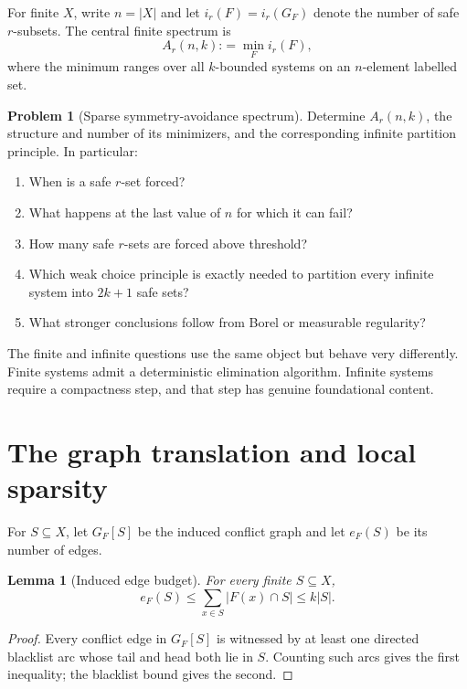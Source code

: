 \documentclass[11pt]{article}
\newtheorem{lemma}[theorem]{Lemma}
\theoremstyle{definition}
\newtheorem{problem}[theorem]{Problem}
\theoremstyle{remark}
\newcommand{\vcent}{\mathbin{:}}
\newcommand{\defeq}{\vcent=}
\begin{document}
For finite $X$, write $n=\lvert X\rvert$ and let
$i_r(F)=i_r(G_F)$ denote the number of safe $r$-subsets.  The central finite
spectrum is
\begin{equation}\label{fbl:eq:Ar-definition}
   A_r(n,k)
   \defeq
   \min_F i_r(F),
\end{equation}
where the minimum ranges over all $k$-bounded systems on an $n$-element
labelled set.

\begin{problem}[Sparse symmetry-avoidance spectrum]\label{fbl:prob:main}
Determine $A_r(n,k)$, the structure and number of its minimizers, and the
corresponding infinite partition principle.  In particular:
\begin{enumerate}[label=(\alph*)]
\item When is a safe $r$-set forced?
\item What happens at the last value of $n$ for which it can fail?
\item How many safe $r$-sets are forced above threshold?
\item Which weak choice principle is exactly needed to partition every
infinite system into $2k+1$ safe sets?
\item What stronger conclusions follow from Borel or measurable regularity?
\end{enumerate}
\end{problem}

The finite and infinite questions use the same object but behave very
differently.  Finite systems admit a deterministic elimination algorithm.
Infinite systems require a compactness step, and that step has genuine
foundational content.

\section{The graph translation and local sparsity}

For $S\subseteq X$, let $G_F[S]$ be the induced conflict graph and let
$e_F(S)$ be its number of edges.

\begin{lemma}[Induced edge budget]\label{fbl:lem:edge-budget}
For every finite $S\subseteq X$,
\begin{equation}\label{fbl:eq:edge-budget}
   e_F(S)
   \le
   \sum_{x\in S}\lvert F(x)\cap S\rvert
   \le k\lvert S\rvert.
\end{equation}
\end{lemma}

\begin{proof}
Every conflict edge in $G_F[S]$ is witnessed by at least one directed
blacklist arc whose tail and head both lie in $S$.  Counting such arcs gives
the first inequality; the blacklist bound gives the second.
\end{proof}
\end{document}
